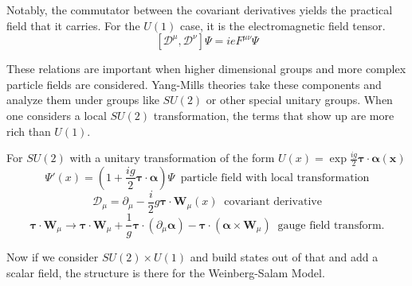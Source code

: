 Notably, the commutator between the covariant derivatives yields the practical field that it carries. For the $U(1) $ case, it is the electromagnetic field tensor. 
\begin{equation}  \left[ \mathcal{D}^\mu,\mathcal{D}^\nu\right] \Psi = ie F^{\mu\nu} \Psi\end{equation}

These relations are important when higher dimensional groups and more complex particle fields are considered. Yang-Mills theories take these components and analyze them under groups like $SU(2)$ or other special unitary groups. When one considers a local $SU(2)$ transformation, the terms that show up are more rich than $U(1)$.  

For $SU(2)$ with a unitary transformation of the form $U(x) = \exp{\frac{ig}{2}\bm{\tau}\cdot\bm{\alpha(x)}}$ 
\begin{equation}\Psi'(x)= (1 + \frac{ig}{2}\bm{\tau}\cdot\bm{\alpha})\Psi \;\;\text{particle field with local transformation}\end{equation}
\begin{equation}\mathcal{D}_\mu = \partial_\mu -\frac{i}{2} g \bm{\tau}\cdot \bm{W}_\mu(x) \;\;\text{covariant derivative}\end{equation}
\begin{equation}\bm{\tau}\cdot\bm{W}_\mu \rightarrow  \bm{\tau}\cdot\bm{W}_\mu + \frac{1}{g}\bm{\tau}\cdot(\partial_\mu \bm{\alpha}) - \bm{\tau}\cdot (\bm{\alpha}\times\bm{W}_\mu) \;\;\text{gauge field transform.} \end{equation}


%

Now if we consider $SU(2)\times U(1)$ and build states out of that and add a scalar field, the structure is there for the Weinberg-Salam Model. 

